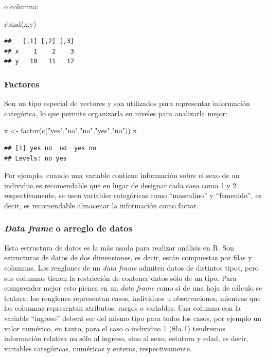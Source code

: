 \documentclass[
  11pt,
  oneside]{book}
\newenvironment{Shaded}{\begin{snugshade}}{\end{snugshade}}
\newcommand{\FunctionTok}[1]{\textcolor[rgb]{0.00,0.00,0.00}{#1}}
\newcommand{\NormalTok}[1]{#1}
\newcommand{\OtherTok}[1]{\textcolor[rgb]{0.56,0.35,0.01}{#1}}
\newcommand{\StringTok}[1]{\textcolor[rgb]{0.31,0.60,0.02}{#1}}
\begin{document}
o columna:

\begin{Shaded}
\begin{Highlighting}[]
\FunctionTok{rbind}\NormalTok{(x,y)}
\end{Highlighting}
\end{Shaded}

\begin{verbatim}
##   [,1] [,2] [,3]
## x    1    2    3
## y   10   11   12
\end{verbatim}

\hypertarget{factores}{%
\subsubsection{Factores}\label{factores}}

Son un tipo especial de vectores y son utilizados para representar información categórica, lo que permite organizarla en niveles para analizarla mejor:

\begin{Shaded}
\begin{Highlighting}[]
\NormalTok{x }\OtherTok{\textless{}{-}} \FunctionTok{factor}\NormalTok{(}\FunctionTok{c}\NormalTok{(}\StringTok{"yes"}\NormalTok{,}\StringTok{"no"}\NormalTok{,}\StringTok{"no"}\NormalTok{,}\StringTok{"yes"}\NormalTok{,}\StringTok{"no"}\NormalTok{))}
\NormalTok{x}
\end{Highlighting}
\end{Shaded}

\begin{verbatim}
## [1] yes no  no  yes no 
## Levels: no yes
\end{verbatim}

Por ejemplo, cuando una variable contiene información sobre el sexo de un individuo es recomendable que en lugar de designar cada caso como 1 y 2 respectivamente, se usen variables categóricas como ``masculino'' y ``femenido'', es decir, es recomendable almacenar la información como factor.

\hypertarget{data-frame-o-arreglo-de-datos}{%
\subsubsection{\texorpdfstring{\emph{Data frame} o arreglo de datos}{Data frame o arreglo de datos}}\label{data-frame-o-arreglo-de-datos}}

Esta estructura de datos es la más usada para realizar análisis en R. Son estructuras de datos de dos dimensiones, es decir, están compuestas por filas y columnas. Los renglones de un \emph{data frame} admiten datos de distintos tipos, pero sus columnas tienen la restricción de contener datos sólo de un tipo. Para comprender mejor esto piensa en un \emph{data frame} como si de una hoja de cálculo se tratara: los renglones representan casos, individuos u observaciones, mientras que las columnas representan atributos, rasgos o variables. Una columna con la variable ``ingreso'' deberá ser del mismo tipo para todos los casos, por ejemplo un valor numérico, en tanto, para el caso o individuo 1 (fila 1) tendremos información relativa no sólo al ingreso, sino al sexo, estatura y edad, es decir, variables categóricas, numéricas y enteros, respectivamente.
\end{document}
